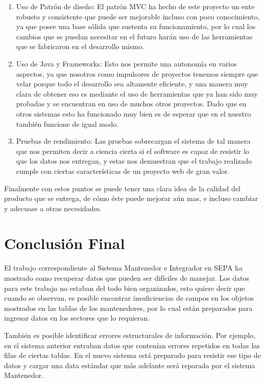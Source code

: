 \documentclass[a4paper,12pt,openany,oneside]{book}
\begin{document}
\begin{enumerate}
        \item Uso de Patrón de diseño: El patrón MVC ha hecho de este proyecto un ente robusto y consistente que puede ser mejorable incluso con poco conocimiento, ya que posee una base sólida que sustenta su funcionamiento, por lo cual los cambios que se puedan necesitar en el futuro harán uso de las herramientas que se fabricaron en el desarrollo mismo.
        \item Uso de Java y Frameworks: Esto nos permite una autonomía en varios aspectos, ya que nosotros como impulsores de proyectos tenemos siempre que velar porque todo el desarrollo sea altamente eficiente, y una manera muy clara de obtener eso es mediante el uso de herramientas que ya han sido muy probadas y se encuentran en uso de muchos otros proyectos. Dado que en otros sistemas esto ha funcionado muy bien es de esperar que en el nuestro también funcione de igual modo.
        \item Pruebas de rendimiento: Las pruebas sobrecargan el sistema de tal manera que nos permiten decir a ciencia cierta si el software es capaz de resistir lo que los datos nos entregan, y estas nos demuestran que el trabajo realizado cumple con ciertas características de un proyecto web de gran valor.
\end{enumerate}

Finalmente con estos puntos se puede tener una clara idea de la calidad del producto que se entrega, de cómo éste puede mejorar aún mas, e incluso cambiar y adecuase a otras necesidades.

\section{Conclusión Final}
El trabajo correspondiente al Sistema Mantenedor e Integrador en SEPA ha mostrado como recuperar datos que pueden ser difíciles de manejar. Los datos para este trabajo no estaban del todo bien organizados, esto quiere decir que cuando se observan, es posible encontrar insuficiencias de campos en los objetos mostrados en las tablas de los mantenedores, por lo cual están preparados para ingresar datos en los sectores que lo requieran.

También es posible identificar errores estructurales de información. Por ejemplo, en el sistema anterior entraban datos que contenían errores repetidos en todas las filas de ciertas tablas. En el nuevo sistema está preparado para resistir ese tipo de datos y cargar una data estándar que más adelante será reparada por el sistema Mantenedor.
\end{document}
